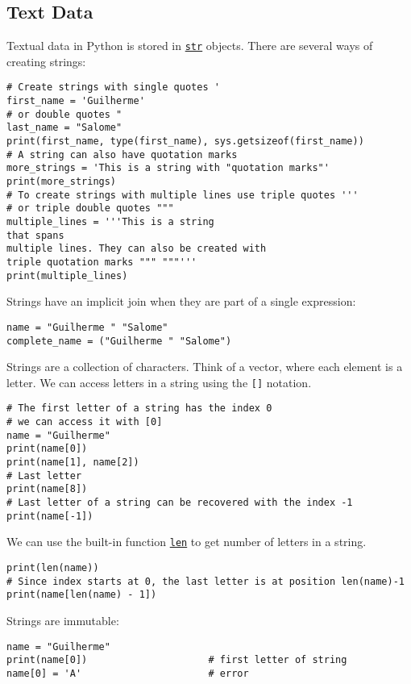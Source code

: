 \documentclass[12pt, a4paper]{article}
\begin{document}
\subsection{Text Data}
\label{sec:orgc511144}
Textual data in Python is stored in \href{https://docs.python.org/3.6/library/stdtypes.html\#textseq}{\texttt{str}} objects.
There are several ways of creating strings:
\lstset{language=jupyter-python,label= ,caption= ,captionpos=b,numbers=none}
\begin{lstlisting}
# Create strings with single quotes '
first_name = 'Guilherme'
# or double quotes "
last_name = "Salome"
print(first_name, type(first_name), sys.getsizeof(first_name))
# A string can also have quotation marks
more_strings = 'This is a string with "quotation marks"'
print(more_strings)
# To create strings with multiple lines use triple quotes '''
# or triple double quotes """
multiple_lines = '''This is a string
that spans
multiple lines. They can also be created with
triple quotation marks """ """'''
print(multiple_lines)
\end{lstlisting}
Strings have an implicit join when they are part of a single expression:
\lstset{language=jupyter-python,label= ,caption= ,captionpos=b,numbers=none}
\begin{lstlisting}
name = "Guilherme " "Salome"
complete_name = ("Guilherme " "Salome")
\end{lstlisting}
Strings are a collection of characters.
Think of a vector, where each element is a letter.
We can access letters in a string using the \texttt{[]} notation.
\lstset{language=jupyter-python,label= ,caption= ,captionpos=b,numbers=none}
\begin{lstlisting}
# The first letter of a string has the index 0
# we can access it with [0]
name = "Guilherme"
print(name[0])
print(name[1], name[2])
# Last letter
print(name[8])
# Last letter of a string can be recovered with the index -1
print(name[-1])
\end{lstlisting}
We can use the built-in function \href{https://docs.python.org/3.6/library/functions.html?\#len}{\texttt{len}} to get number of letters in a string.
\lstset{language=jupyter-python,label= ,caption= ,captionpos=b,numbers=none}
\begin{lstlisting}
print(len(name))
# Since index starts at 0, the last letter is at position len(name)-1
print(name[len(name) - 1])
\end{lstlisting}
Strings are immutable:
\lstset{language=jupyter-python,label= ,caption= ,captionpos=b,numbers=none}
\begin{lstlisting}
name = "Guilherme"
print(name[0])                     # first letter of string
name[0] = 'A'                      # error
\end{lstlisting}
\end{document}
